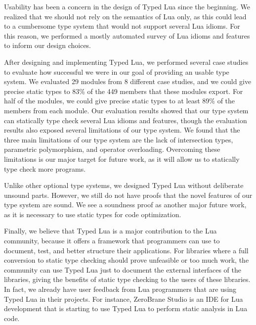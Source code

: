 Usability has been a concern in the design of Typed Lua since the beginning.
We realized that we should not rely on the semantics of Lua only,
as this could lead to a cumbersome type system that would not support
several Lua idioms.
For this reason, we performed a mostly automated survey of Lua idioms
and features to inform our design choices.

After designing and implementing Typed Lua, we performed several
case studies to evaluate how successful we were in our goal of
providing an usable type system.
We evaluated 29 modules from 8 different case studies,
and we could give precise static types to 83\% of the 449
members that these modules export.
For half of the modules, we could give precise static types to
at least 89\% of the members from each module.
Our evaluation results showed that our type system can statically
type check several Lua idioms and features, though the evaluation
results also exposed several limitations of our type system.
We found that the three main limitations of our type system are
the lack of intersection types, parametric polymorphism, and operator overloading.
Overcoming these limitations is our major target for future work,
as it will allow us to statically type check more programs.

Unlike other optional type systems, we designed Typed Lua without
deliberate unsound parts.
However, we still do not have proofs that the novel features of
our type system are sound.
We see a soundness proof as another major future work, as it is
necessary to use static types for code optimization.

Finally, we believe that Typed Lua is a major contribution to the Lua community,
because it offers a framework that programmers can use to document,
test, and better structure their applications.
For libraries where a full conversion to static type checking should
prove unfeasible or too much work, the community can use Typed Lua
just to document the external interfaces of the libraries,
giving the benefits of static type checking to the users of these
libraries.
In fact, we already have user feedback from Lua programmers that are
using Typed Lua in their projects.
For instance, ZeroBrane Studio is an IDE for Lua development that is
starting to use Typed Lua to perform static analysis in Lua code.

